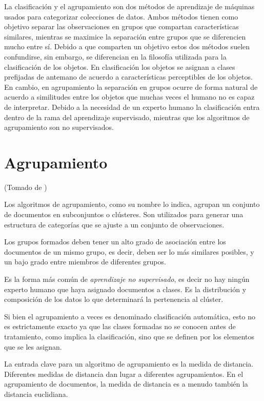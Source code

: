 \documentclass{llncs}
\begin{document}
La clasificaci\'on y el agrupamiento son dos m\'etodos de aprendizaje de m\'aquinas usados para categorizar colecciones de datos. Ambos m\'etodos tienen como objetivo separar las observaciones en grupos que compartan caracter\'isticas similares, mientras se maximice la separaci\'on entre grupos que se diferencien mucho entre s\'i. Debido a que comparten un objetivo estos dos m\'etodos suelen confundirse, sin embargo, se diferencian en la filosof\'ia utilizada para la clasificaci\'on de los objetos. En clasificaci\'on los objetos se asignan a clases prefijadas de antemano de acuerdo a caracter\'isticas perceptibles de los objetos. En cambio, en agrupamiento la separaci\'on en grupos ocurre de forma natural de acuerdo a similitudes entre los objetos que muchas veces el humano no es capaz de interpretar. Debido a la necesidad de un experto humano la clasificaci\'on entra dentro de la rama del aprendizaje supervisado, mientras que los algoritmos de agrupamiento son no supervisados.

\section{Agrupamiento}

\begin{flushright}
	\scriptsize*(Tomado de \cite{B1})
	\normalsize
\end{flushright}

Los algoritmos de agrupamiento, como su nombre lo indica, agrupan un conjunto de documentos en subconjuntos o clústeres. Son utilizados para generar una estructura de categorías que se ajuste a un conjunto de observaciones. 

Los grupos formados deben tener un alto grado de asociación entre los documentos de un mismo grupo, es decir, deben ser lo m\'as similares posibles, y un bajo grado entre miembros de diferentes grupos. 

Es la forma más común de \textit{aprendizaje no supervisado}, es decir no hay ningún experto humano que haya asignado documentos a clases. Es la distribución y composición de los datos lo que determinará la pertenencia al clúster. 

Si bien el agrupamiento a veces es denominado clasificación automática, esto no es estrictamente exacto ya que las clases formadas no se conocen antes de tratamiento, como implica la clasificación, sino que se definen por los elementos que se les asignan.

La entrada clave para un algoritmo de agrupamiento es la medida de distancia. Diferentes medidas de distancia dan lugar a diferentes agrupamientos. En el agrupamiento de documentos, la medida de distancia es a menudo también la distancia euclidiana. 
\end{document}
